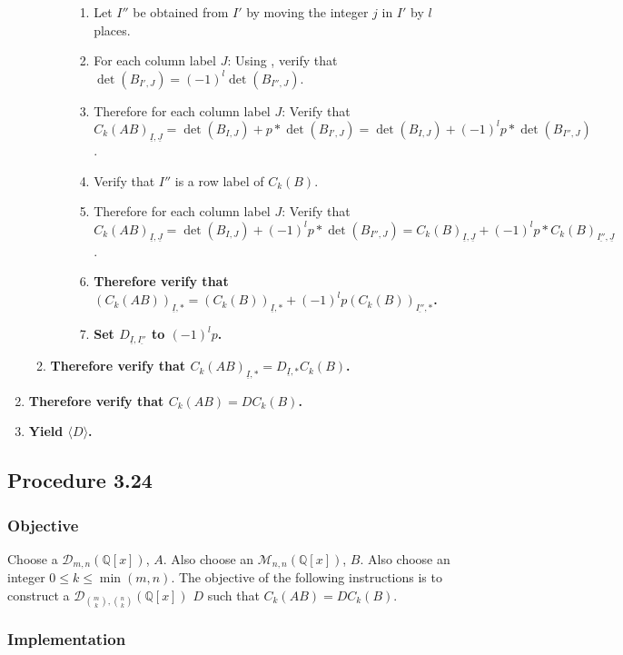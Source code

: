\documentclass[twocolumn]{article}
\newcommand{\ul}[1]{\underline{#1}}
\newcommand{\procedure}[2][]{\subsection*{Procedure #2 \ifthenelse{\equal{#1}{}}{}{(#1)}}\label{sec:procedure #2}}
\newcommand{\objective}{\subsubsection*{Objective}}
\newcommand{\implementation}{\subsubsection*{Implementation}}
\newcommand{\procedurehr}[2][]{\hyperref[sec:procedure #2]{\ifthenelse{\equal{#1}{}}{procedure #2}{#1}}}
\begin{document}
\begin{enumerate}
\begin{enumerate}
\begin{enumerate}
\begin{enumerate}
								\item Let $I''$ be obtained from $I'$ by moving the integer $j$ in $I'$ by $l$ places.
								\item For each column label $J$: Using \procedurehr{3.20}, verify that $\det(B_{I',J})=(-1)^l\det(B_{I'',J})$.
								\item Therefore for each column label $J$: Verify that ${C_k(AB)}_{\ul{I},\ul{J}}=\det(B_{I,J})+p*\det(B_{I',J})=\det(B_{I,J})+(-1)^lp*\det(B_{I'',J})$.
								\item Verify that $I''$ is a row label of $C_k(B)$.
								\item Therefore for each column label $J$: Verify that ${C_k(AB)}_{\ul{I},\ul{J}}=\det(B_{I,J})+(-1)^lp*\det(B_{I'',J})={C_k(B)}_{\ul{I},\ul{J}}+(-1)^lp*{C_k(B)}_{\ul{I''},\ul{J}}$.
								\item \textbf{Therefore verify that $(C_k(AB))_{\ul{I},*}=(C_k(B))_{\ul{I},*}+(-1)^lp(C_k(B))_{\ul{I''},*}$.}
								\item \textbf{Set $D_{\ul{I},\ul{I''}}$ to $(-1)^lp$.}
							\end{enumerate}
						\end{enumerate}
						\item \textbf{Therefore verify that ${C_k(AB)}_{\ul{I},*}=D_{\ul{I},*}C_k(B)$.}
					\end{enumerate}
					\item \textbf{Therefore verify that $C_k(AB)=DC_k(B)$.}
					\item \textbf{Yield $\langle D\rangle$.}
				\end{enumerate}
		\procedure{3.24}
			\objective
				Choose a $\mathcal{D}_{m,n}(\mathbb{Q}[x])$, $A$. Also choose an $\mathcal{M}_{n,n}(\mathbb{Q}[x])$, $B$. Also choose an integer $0\le k\le\min(m,n)$. The objective of the following instructions is to construct a $\mathcal{D}_{\binom{m}{k},\binom{n}{k}}(\mathbb{Q}[x])$ $D$ such that $C_k(AB)=DC_k(B)$.
			\implementation
\end{document}
